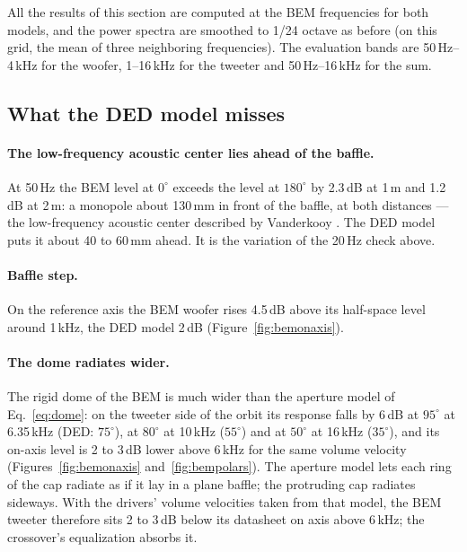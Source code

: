 \documentclass[11pt,a4paper]{article}
\begin{document}
All the results of this section are computed at the BEM frequencies for both models, and the power
spectra are smoothed to 1/24 octave as before (on this grid, the mean of three neighboring
frequencies). The evaluation bands are 50\,Hz--4\,kHz for the woofer, 1--16\,kHz for the tweeter and
50\,Hz--16\,kHz for the sum.

\subsection{What the DED model misses}

\paragraph{The low-frequency acoustic center lies ahead of the baffle.} At 50\,Hz the BEM level at
$0^\circ$ exceeds the level at $180^\circ$ by 2.3\,dB at 1\,m and 1.2\,dB at 2\,m: a monopole about
130\,mm in front of the baffle, at both distances --- the low-frequency acoustic center described by
Vanderkooy \cite{vanderkooy2010}. The DED model puts it about 40 to 60\,mm ahead. It is the variation of
the 20\,Hz check above.

\paragraph{Baffle step.} On the reference axis the BEM woofer rises 4.5\,dB above its half-space level
around 1\,kHz, the DED model 2\,dB (Figure~\ref{fig:bemonaxis}).

\paragraph{The dome radiates wider.} The rigid dome of the BEM is much wider than the aperture model of
Eq.~\eqref{eq:dome}: on the tweeter side of the orbit its response falls by 6\,dB at $95^\circ$ at
6.35\,kHz (DED: $75^\circ$), at $80^\circ$ at 10\,kHz ($55^\circ$) and at $50^\circ$ at 16\,kHz ($35^\circ$),
and its on-axis level is 2 to 3\,dB lower above 6\,kHz for the same volume velocity
(Figures~\ref{fig:bemonaxis} and~\ref{fig:bempolars}). The aperture model lets each ring of the cap
radiate as if it lay in a plane baffle; the protruding cap radiates sideways. With the drivers' volume
velocities taken from that model, the BEM tweeter therefore sits 2 to 3\,dB below its datasheet on axis
above 6\,kHz; the crossover's equalization absorbs it.
\end{document}
